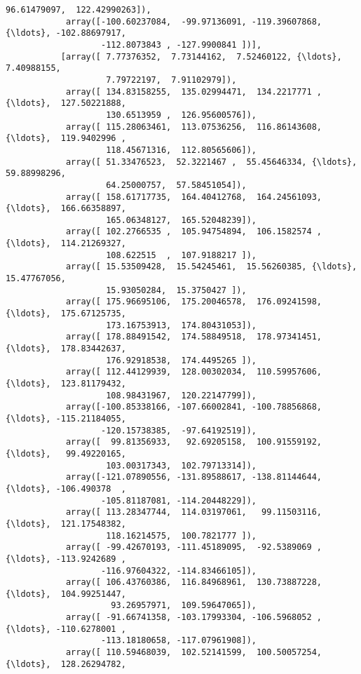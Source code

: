 \documentclass[11pt]{article}
\begin{document}
\begin{Verbatim}[commandchars=\\\{\}]
                     96.61479097,  122.42990263]),
            array([-100.60237084,  -99.97136091, -119.39607868, {\ldots}, -102.88697917,
                   -112.8073843 , -127.9900841 ])],
           [array([ 7.77376352,  7.73144162,  7.52460122, {\ldots},  7.40988155,
                    7.79722197,  7.91102979]),
            array([ 134.83158255,  135.02994471,  134.2217771 , {\ldots},  127.50221888,
                    130.6513959 ,  126.95600576]),
            array([ 115.28063461,  113.07536256,  116.86143608, {\ldots},  119.9402996 ,
                    118.45671316,  112.80565606]),
            array([ 51.33476523,  52.3221467 ,  55.45646334, {\ldots},  59.88998296,
                    64.25000757,  57.58451054]),
            array([ 158.61717735,  164.40412768,  164.24561093, {\ldots},  166.66358897,
                    165.06348127,  165.52048239]),
            array([ 102.2766535 ,  105.94754894,  106.1582574 , {\ldots},  114.21269327,
                    108.622515  ,  107.9188217 ]),
            array([ 15.53509428,  15.54245461,  15.56260385, {\ldots},  15.47767056,
                    15.93050284,  15.3750427 ]),
            array([ 175.96695106,  175.20046578,  176.09241598, {\ldots},  175.67125735,
                    173.16753913,  174.80431053]),
            array([ 178.88491542,  174.58849518,  178.97341451, {\ldots},  178.83442637,
                    176.92918538,  174.4495265 ]),
            array([ 112.44129939,  128.00302034,  110.59957606, {\ldots},  123.81179432,
                    108.98431967,  120.22147799]),
            array([-100.85338166, -107.66002841, -100.78856868, {\ldots}, -115.21184055,
                   -120.15738385,  -97.64192519]),
            array([  99.81356933,   92.69205158,  100.91559192, {\ldots},   99.49220165,
                    103.00317343,  102.79713314]),
            array([-121.07890556, -131.89588617, -138.81144644, {\ldots}, -106.490378  ,
                   -105.81187081, -114.20448229]),
            array([ 113.28347744,  114.03197061,   99.11503116, {\ldots},  121.17548382,
                    118.16214575,  100.7821777 ]),
            array([ -99.42670193, -111.45189095,  -92.5389069 , {\ldots}, -113.9242689 ,
                   -116.97604322, -114.83466105]),
            array([ 106.43760386,  116.84968961,  130.73887228, {\ldots},  104.99251447,
                     93.26957971,  109.59647065]),
            array([ -91.66741358, -103.17993304, -106.5968052 , {\ldots}, -110.6278001 ,
                   -113.18180658, -117.07961908]),
            array([ 110.59468039,  102.52141599,  100.50057254, {\ldots},  128.26294782,

\end{Verbatim}
\end{document}
